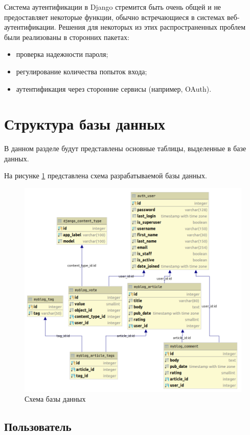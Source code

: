 Система аутентификации в Django стремится быть очень общей и не предоставляет некоторые функции, обычно встречающиеся в системах веб-аутентификации.
Решения для некоторых из этих распространенных проблем были реализованы в сторонних пакетах:
\begin{itemize}
	\item проверка надежности пароля;
	\item регулирование количества попыток входа;
	\item аутентификация через сторонние сервисы (например, OAuth).
\end{itemize}

\section{Структура базы данных}

В данном разделе будут представлены основные таблицы, выделенные в базе данных.

На рисунке \ref{img:db} представлена схема разрабатываемой базы данных.

\begin{figure}[H]
	\centering
	\includegraphics[width=\linewidth]{inc/img/db}
	\caption{Схема базы данных}
	\label{img:db}
\end{figure}

\subsection{Пользователь}

